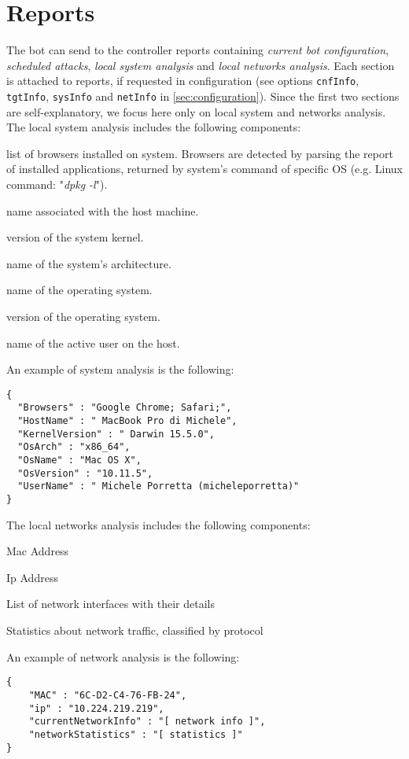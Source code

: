\section{Reports}
\label{sec:reports}

The bot can send to the controller reports containing \textit{current bot configuration}, \textit{scheduled attacks}, \textit{local system analysis} and \textit{local networks analysis}. Each section is attached to reports, if requested in configuration (see options \texttt{cnfInfo}, \texttt{tgtInfo}, \texttt{sysInfo} and \texttt{netInfo} in \ref{sec:configuration}). Since the first two sections are self-explanatory, we focus here only on local system and networks analysis.\\

The local system analysis includes the following components:
\begin{description}
  \setlength\itemsep{1em}
    \item [browsers] list of browsers installed on system. Browsers are detected by parsing the report of installed applications, returned by system's command of specific OS (e.g. Linux command: "\textit{dpkg -l}").
	\item [hostName] name associated with the host machine.
	\item [kernelVersion] version of the system kernel.
	\item [osArch] name of the system's architecture.
  	\item [osName] name of the operating system.
  	\item [osVersion] version of the operating system.
  	\item [userName] name of the active user on the host.
\end{description}
\;

An example of system analysis is the following:
\begin{verbatim}
{
  "Browsers" : "Google Chrome; Safari;",
  "HostName" : " MacBook Pro di Michele",
  "KernelVersion" : " Darwin 15.5.0",
  "OsArch" : "x86_64",
  "OsName" : "Mac OS X",
  "OsVersion" : "10.11.5",
  "UserName" : " Michele Porretta (micheleporretta)"
}
\end{verbatim}

The local networks analysis includes the following components:

\begin{description}
  \setlength\itemsep{1em}
  \item [Mac] Mac Address
  \item [Ip] Ip Address 
  \item [CurrentNetworkInfo] List of network interfaces with their details
  \item [NetworkStatistics] Statistics about network traffic, classified by protocol
\end{description}

An example of network analysis is the following:

\begin{verbatim}
{
  	"MAC" : "6C-D2-C4-76-FB-24",
  	"ip" : "10.224.219.219",
  	"currentNetworkInfo" : "[ network info ]",
  	"networkStatistics" : "[ statistics ]"
}
\end{verbatim}
